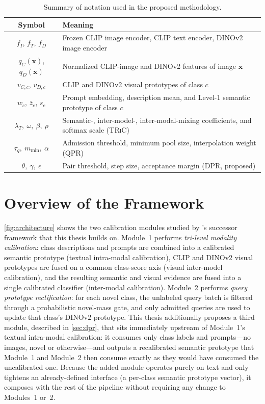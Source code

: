 \documentclass{iutbscthesis}
\begin{document}
\begin{table}[H]
    \centering
    \begin{tabular}{c l}
        \toprule
        Symbol & Meaning \\
        \midrule
        $f_I$, $f_T$, $f_D$ & Frozen CLIP image encoder, CLIP text encoder, DINOv2 image encoder \\
        $q_C(\mathbf{x})$, $q_D(\mathbf{x})$ & Normalized CLIP-image and DINOv2 features of image $\mathbf{x}$ \\
        $v_{C,c}$, $v_{D,c}$ & CLIP and DINOv2 visual prototypes of class $c$ \\
        $w_c$, $\bar z_c$, $s_c$ & Prompt embedding, description mean, and Level-1 semantic prototype of class $c$ \\
        $\lambda_T,\ \omega,\ \beta,\ \rho$ & Semantic-, inter-model-, inter-modal-mixing coefficients, and softmax scale (\textsc{TRiC}) \\
        $\tau_q,\ m_{\min},\ \alpha$ & Admission threshold, minimum pool size, interpolation weight (QPR) \\
        $\theta,\ \gamma,\ \epsilon$ & Pair threshold, step size, acceptance margin (DPR, proposed) \\
        \bottomrule
    \end{tabular}
    \caption{Summary of notation used in the proposed methodology.}
    \label{tab:notation}
\end{table}

\section{Overview of the Framework}
\label{sec:overview}

\autoref{fig:architecture} shows the two calibration modules studied by \textcite{chen2025bimc}'s successor framework that this thesis builds on. Module~1 performs \emph{tri-level modality calibration}: class descriptions and prompts are combined into a calibrated semantic prototype (textual intra-modal calibration), CLIP and DINOv2 visual prototypes are fused on a common class-score axis (visual inter-model calibration), and the resulting semantic and visual evidence are fused into a single calibrated classifier (inter-modal calibration). Module~2 performs \emph{query prototype rectification}: for each novel class, the unlabeled query batch is filtered through a probabilistic novel-mass gate, and only admitted queries are used to update that class's DINOv2 prototype. This thesis additionally proposes a third module, described in \autoref{sec:dpr}, that sits immediately upstream of Module~1's textual intra-modal calibration: it consumes only class labels and prompts---no images, novel or otherwise---and outputs a recalibrated semantic prototype that Module~1 and Module~2 then consume exactly as they would have consumed the uncalibrated one. Because the added module operates purely on text and only tightens an already-defined interface (a per-class semantic prototype vector), it composes with the rest of the pipeline without requiring any change to Modules~1 or~2.
\end{document}
